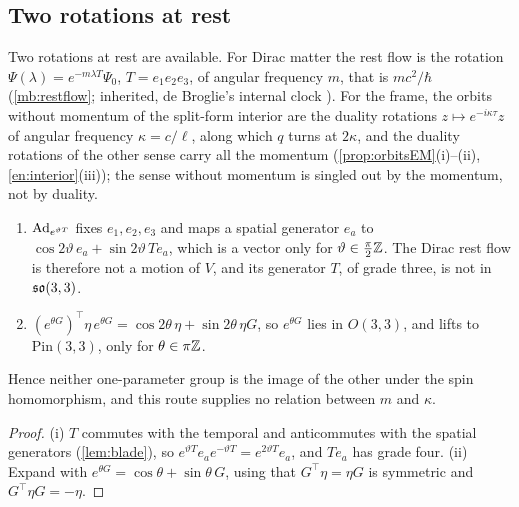 \subsection{Two rotations at rest}
\label{sec:resttworot}

Two rotations at rest are available. For Dirac matter the rest flow is the rotation $\Psi(\lambda)=e^{-m\lambda T}\Psi_0$, $T=e_1e_2e_3$, of
angular frequency $m$, that is $mc^2/\hbar$ (\cref{mb:restflow}; inherited, de Broglie's internal clock \cite{deBroglie1925}). For the frame, the
orbits without momentum of the split-form interior are the duality rotations $z\mapsto e^{-i\kappa\tau}z$ of angular frequency $\kappa=c/\ell$,
along which $q$ turns at $2\kappa$, and the duality rotations of the other sense carry all the momentum (\cref{prop:orbitsEM}(i)--(ii),
\cref{en:interior}(iii)); the sense without momentum is singled out by the momentum, not by duality.

\begin{proposition}
\label{cl:norel}
\begin{enumerate}[label=(\roman*),leftmargin=2.2em]
\item $\operatorname{Ad}_{e^{\vartheta T}}$ fixes $e_1,e_2,e_3$ and maps a spatial generator $e_a$ to $\cos2\vartheta\,e_a+\sin2\vartheta\,Te_a$, which is a vector
only for $\vartheta\in\tfrac\pi2\mathbb{Z}$. The Dirac rest flow is therefore not a motion of $V$, and its generator $T$, of grade three, is not in $\mathfrak{so}(3,3)$.
\item $(e^{\theta G})^{\!\top}\eta\,e^{\theta G}=\cos2\theta\,\eta+\sin2\theta\,\eta G$, so $e^{\theta G}$ lies in $O(3,3)$, and lifts to
$\mathrm{Pin}(3,3)$, only for $\theta\in\pi\mathbb{Z}$.
\end{enumerate}
Hence neither one-parameter group is the image of the other under the spin homomorphism, and this route supplies no relation between $m$
and $\kappa$.
\end{proposition}

\begin{proof}
(i) $T$ commutes with the temporal and anticommutes with the spatial generators (\cref{lem:blade}), so $e^{\vartheta T}e_ae^{-\vartheta T}=e^{2\vartheta T}e_a$,
and $Te_a$ has grade four. (ii) Expand with $e^{\theta G}=\cos\theta+\sin\theta\,G$, using that $G^{\!\top}\eta=\eta G$ is symmetric and
$G^{\!\top}\eta G=-\eta$.
\end{proof}

